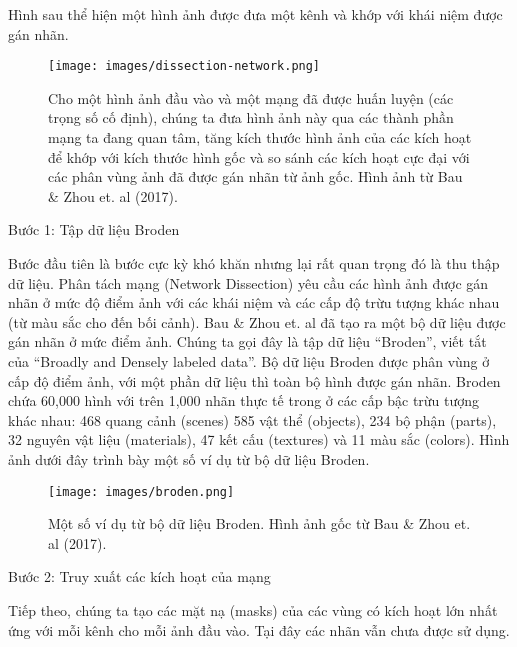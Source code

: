 Hình sau thể hiện một hình ảnh được đưa một kênh và khớp với khái niệm được gán nhãn.

\begin{figure*}[h!]
	\centering
	\texttt{[image: images/dissection-network.png]}
	\label{fig:7_5}
	\caption{Cho một hình ảnh đầu vào và một mạng đã được huấn luyện (các trọng số cố định), chúng ta đưa hình ảnh này qua các thành phần mạng ta đang quan tâm, tăng kích thước hình ảnh của các kích hoạt để khớp với kích thước hình gốc và so sánh các kích hoạt cực đại với các  phân vùng ảnh đã được gán nhãn từ ảnh gốc. Hình ảnh từ Bau \& Zhou et. al (2017).}
\end{figure*}


Bước 1: Tập dữ liệu Broden
\newline

Bước đầu tiên là bước cực kỳ khó khăn nhưng lại rất quan trọng đó là thu thập dữ liệu. Phân tách mạng (Network Dissection) yêu cầu các hình ảnh được gán nhãn ở mức độ điểm ảnh với các khái niệm và các cấp độ trừu tượng khác nhau (từ màu sắc cho đến bối cảnh). Bau \& Zhou et. al đã tạo ra một bộ dữ liệu được gán nhãn ở mức điểm ảnh. Chúng ta gọi đây là tập dữ liệu ``Broden'', viết tắt của ``Broadly and Densely labeled data''. Bộ dữ liệu Broden được phân vùng ở cấp độ điểm ảnh, với một phần dữ liệu thì toàn bộ hình được gán nhãn. Broden chứa 60,000 hình với trên 1,000 nhãn thực tế trong ở các cấp bậc trừu tượng khác nhau: 468 quang cảnh (scenes) 585 vật thể (objects), 234 bộ phận (parts), 32 nguyên vật liệu (materials), 47 kết cấu (textures) và 11 màu sắc (colors). Hình ảnh dưới đây trình bày một số ví dụ từ bộ dữ liệu Broden.

\begin{figure*}[h!]
	\centering
	\texttt{[image: images/broden.png]}
	\label{fig:7_6}
	\caption{Một số ví dụ từ bộ dữ liệu Broden. Hình ảnh gốc từ Bau \& Zhou et. al (2017).}
\end{figure*}
\newpage

Bước 2: Truy xuất các kích hoạt của mạng
\newline

Tiếp theo, chúng ta tạo các mặt nạ (masks) của các vùng có kích hoạt lớn nhất ứng với mỗi kênh cho mỗi ảnh đầu vào. Tại đây các nhãn vẫn chưa được sử dụng.

